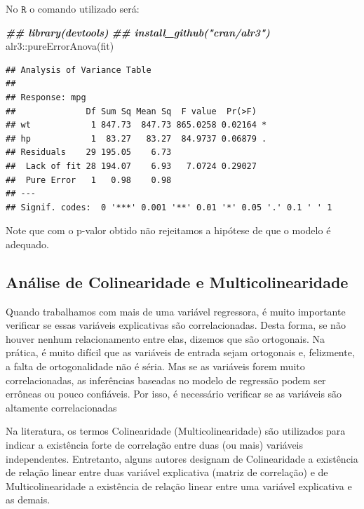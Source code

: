 \documentclass[
]{book}
\newenvironment{Shaded}{\begin{snugshade}}{\end{snugshade}}
\newcommand{\DocumentationTok}[1]{\textcolor[rgb]{0.56,0.35,0.01}{\textbf{\textit{#1}}}}
\newcommand{\FunctionTok}[1]{\textcolor[rgb]{0.00,0.00,0.00}{#1}}
\newcommand{\NormalTok}[1]{#1}
\newcommand{\SpecialCharTok}[1]{\textcolor[rgb]{0.00,0.00,0.00}{#1}}
\begin{document}
No \(\texttt{R}\) o comando utilizado será:

\begin{Shaded}
\begin{Highlighting}[]
\DocumentationTok{\#\# library(devtools)}
\DocumentationTok{\#\# install\_github("cran/alr3")}
\NormalTok{alr3}\SpecialCharTok{::}\FunctionTok{pureErrorAnova}\NormalTok{(fit)}
\end{Highlighting}
\end{Shaded}

\begin{verbatim}
## Analysis of Variance Table
## 
## Response: mpg
##              Df Sum Sq Mean Sq  F value  Pr(>F)  
## wt            1 847.73  847.73 865.0258 0.02164 *
## hp            1  83.27   83.27  84.9737 0.06879 .
## Residuals    29 195.05    6.73                   
##  Lack of fit 28 194.07    6.93   7.0724 0.29027  
##  Pure Error   1   0.98    0.98                   
## ---
## Signif. codes:  0 '***' 0.001 '**' 0.01 '*' 0.05 '.' 0.1 ' ' 1
\end{verbatim}

Note que com o p-valor obtido não rejeitamos a hipótese de que o modelo é adequado.

\hypertarget{anuxe1lise-de-colinearidade-e-multicolinearidade}{%
\subsection{Análise de Colinearidade e Multicolinearidade}\label{anuxe1lise-de-colinearidade-e-multicolinearidade}}

Quando trabalhamos com mais de uma variável regressora, é muito importante verificar se essas variáveis explicativas são correlacionadas. Desta forma, se não houver nenhum relacionamento entre elas, dizemos que são ortogonais. Na prática, é muito difícil que as variáveis de entrada sejam ortogonais e, felizmente, a falta de ortogonalidade não é séria. Mas se as variáveis forem muito correlacionadas, as inferências baseadas no modelo de regressão podem ser errôneas ou pouco confiáveis. Por isso, é necessário verificar se as variáveis são altamente correlacionadas

Na literatura, os termos Colinearidade (Multicolinearidade) são utilizados para indicar a existência forte de correlação entre duas (ou mais) variáveis independentes. Entretanto, alguns autores designam de Colinearidade a existência de relação linear entre duas variável explicativa (matriz de correlação) e de Multicolinearidade a existência de relação linear entre uma variável explicativa e as demais.
\end{document}
